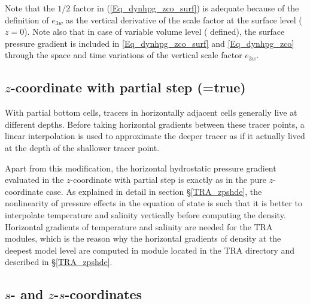 Note that the $1/2$ factor in (\ref{Eq_dynhpg_zco_surf}) is adequate because of 
the definition of $e_{3w}$ as the vertical derivative of the scale factor at the surface 
level ($z=0$). Note also that in case of variable volume level ( defined), the 
surface pressure gradient is included in \eqref{Eq_dynhpg_zco_surf} and \eqref{Eq_dynhpg_zco} 
through the space and time variations of the vertical scale factor $e_{3w}$.

\subsection   [$z$-coordinate with partial step (\np{ln\_dynhpg\_zps})]
			{$z$-coordinate with partial step (=true)}
\label{DYN_hpg_zps}

With partial bottom cells, tracers in horizontally adjacent cells generally live at 
different depths. Before taking horizontal gradients between these tracer points, 
a linear interpolation is used to approximate the deeper tracer as if it actually lived 
at the depth of the shallower tracer point. 

Apart from this modification, the horizontal hydrostatic pressure gradient evaluated 
in the $z$-coordinate with partial step is exactly as in the pure $z$-coordinate case. 
As explained in detail in section \S\ref{TRA_zpshde}, the nonlinearity of pressure 
effects in the equation of state is such that it is better to interpolate temperature and 
salinity vertically before computing the density. Horizontal gradients of temperature 
and salinity are needed for the TRA modules, which is the reason why the horizontal 
gradients of density at the deepest model level are computed in module  
located in the TRA directory and described in \S\ref{TRA_zpshde}.

\subsection{$s$- and $z$-$s$-coordinates}
\label{DYN_hpg_sco}

